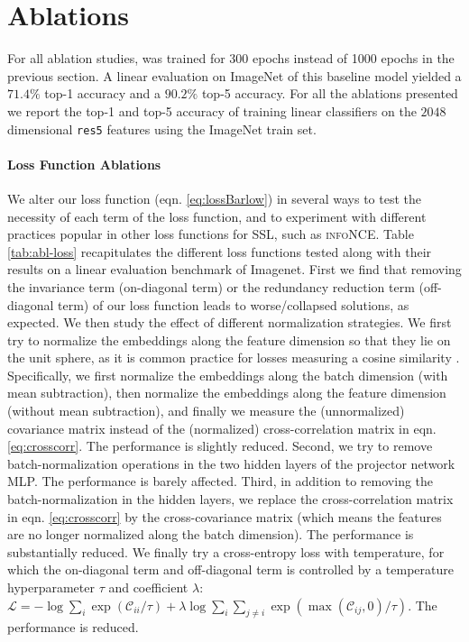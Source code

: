 \section{Ablations}

For all ablation studies, \AlgoName{} was trained for 300 epochs instead of 1000 epochs in the previous section. A linear evaluation on ImageNet of this baseline model yielded a $71.4\%$ top-1 accuracy and a $90.2\%$ top-5 accuracy. For all the ablations presented we report the top-1 and top-5 accuracy of training linear classifiers on the $2048$ dimensional \texttt{res5} features using the ImageNet train set.


\paragraph{Loss Function Ablations} 
We alter our loss function (eqn. \ref{eq:lossBarlow}) in several ways to test the necessity of each term of the loss function, and to experiment with different practices popular in other loss functions for SSL, such as \textsc{infoNCE}.  Table \ref{tab:abl-loss} recapitulates the different loss functions tested along with their results on a linear evaluation benchmark of Imagenet. First we find that removing the invariance term (on-diagonal term) or the redundancy reduction term (off-diagonal term) of our loss function leads to worse/collapsed solutions, as expected. We then study the effect of different normalization strategies. We first try to normalize the embeddings along the feature dimension so that they lie on the unit sphere, as it is common practice for losses measuring a cosine similarity \cite{chen2020simple,grill2020bootstrap,wang_understanding_2020}. Specifically, we first normalize the embeddings along the batch dimension (with mean subtraction), then normalize the embeddings along the feature dimension (without mean subtraction), and finally we measure the (unnormalized) covariance matrix instead of the (normalized) cross-correlation matrix in eqn. \ref{eq:crosscorr}. The performance is slightly reduced. Second, we try to remove batch-normalization operations in the two hidden layers of the projector network MLP. The performance is barely affected. Third, in addition to removing the batch-normalization in the hidden layers, we replace the cross-correlation matrix in eqn. \ref{eq:crosscorr} by the cross-covariance matrix (which means the features are no longer normalized along the batch dimension). The performance is substantially reduced. We finally try a cross-entropy loss with temperature, for which the on-diagonal term and off-diagonal term is controlled by a temperature hyperparameter $\tau$ and coefficient $\lambda$: 
$\mathcal{L} = -\log\sum_i\exp(\mathcal{C}_{ii}/\tau) + \lambda \log\sum_i\sum_{j\neq i}\exp(\max(\mathcal{C}_{ij}, 0)/\tau)$. The performance is reduced.

